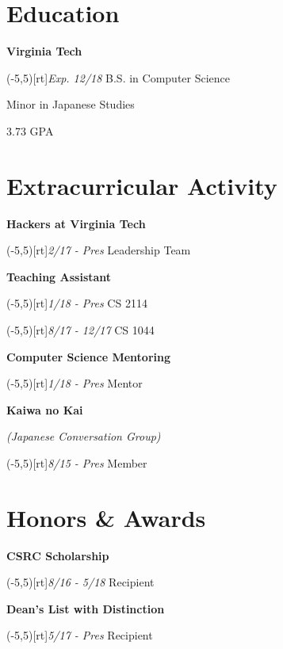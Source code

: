 \documentclass[9pt]{extarticle}
\newcommand{\Subsection}[2]{
    {\normalsize\color{subsection}\textbf{#1}}
    \begin{trivlist}
        \color{bullet}
        #2
    \end{trivlist}
}
\newcommand{\ChronoItem}[2]{
    \item {%
        \makebox(-5,5)[rt]{\footnotesize\color{setting}\textit{#2}}%
        \color{bullet}#1
    }
}
\newcommand{\vsubspace}{\vspace{1.5em}}
\newcommand{\vmainspace}{\vspace{2em}}
\begin{document}
\begin{paracol}{2}
\begin{rightcolumn}
        \section{Education}
            \Subsection{Virginia Tech}{
                \ChronoItem{B.S. in Computer Science}{Exp. 12/18}
                \item Minor in Japanese Studies
                \item 3.73 GPA
            }
        \vmainspace
        \section{Extracurricular Activity}
            \Subsection{Hackers at Virginia Tech}{
                \ChronoItem{Leadership Team}{2/17 - Pres}
            }
            \vsubspace
            \Subsection{Teaching Assistant}{
                \ChronoItem{CS 2114}{1/18 - Pres}
                \ChronoItem{CS 1044}{8/17 - 12/17}
            }
            \vsubspace
            \Subsection{Computer Science Mentoring}{
                \ChronoItem{Mentor}{1/18 - Pres}
            }
            \vsubspace
            \Subsection{Kaiwa no Kai}{
                \item {\color{info}\textit{(Japanese Conversation Group)}}
                \ChronoItem{Member}{8/15 - Pres}
            }
        \vmainspace
        \section{Honors \& Awards}
            \Subsection{CSRC Scholarship}{
                \ChronoItem{Recipient}{8/16 - 5/18}
            }
            \vsubspace
            \Subsection{Dean's List with Distinction}{
                \ChronoItem{Recipient}{5/17 - Pres}
            }
    \end{rightcolumn}
\end{paracol}
\end{document}
